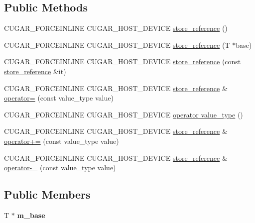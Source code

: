 \subsection*{Public Methods}
\begin{DoxyCompactItemize}
\item 
C\+U\+G\+A\+R\+\_\+\+F\+O\+R\+C\+E\+I\+N\+L\+I\+NE C\+U\+G\+A\+R\+\_\+\+H\+O\+S\+T\+\_\+\+D\+E\+V\+I\+CE \hyperlink{structcugar_1_1cuda_1_1store__reference_ab56aeb2a05979c31d804544dd7eed83b}{store\+\_\+reference} ()
\item 
C\+U\+G\+A\+R\+\_\+\+F\+O\+R\+C\+E\+I\+N\+L\+I\+NE C\+U\+G\+A\+R\+\_\+\+H\+O\+S\+T\+\_\+\+D\+E\+V\+I\+CE \hyperlink{structcugar_1_1cuda_1_1store__reference_a918aa3ac7cefdf20105b490e2ba5aa59}{store\+\_\+reference} (T $\ast$base)
\item 
C\+U\+G\+A\+R\+\_\+\+F\+O\+R\+C\+E\+I\+N\+L\+I\+NE C\+U\+G\+A\+R\+\_\+\+H\+O\+S\+T\+\_\+\+D\+E\+V\+I\+CE \hyperlink{structcugar_1_1cuda_1_1store__reference_afb98e23cc7c9a7cf5bda4938dd200c55}{store\+\_\+reference} (const \hyperlink{structcugar_1_1cuda_1_1store__reference}{store\+\_\+reference} \&it)
\item 
C\+U\+G\+A\+R\+\_\+\+F\+O\+R\+C\+E\+I\+N\+L\+I\+NE C\+U\+G\+A\+R\+\_\+\+H\+O\+S\+T\+\_\+\+D\+E\+V\+I\+CE \hyperlink{structcugar_1_1cuda_1_1store__reference}{store\+\_\+reference} \& \hyperlink{structcugar_1_1cuda_1_1store__reference_a0e6edeb8418e39730eed64b7821e8fc8}{operator=} (const value\+\_\+type value)
\item 
C\+U\+G\+A\+R\+\_\+\+F\+O\+R\+C\+E\+I\+N\+L\+I\+NE C\+U\+G\+A\+R\+\_\+\+H\+O\+S\+T\+\_\+\+D\+E\+V\+I\+CE \hyperlink{structcugar_1_1cuda_1_1store__reference_a7cd742e206cf9bbe7f4052e93d6ca45d}{operator value\+\_\+type} ()
\item 
C\+U\+G\+A\+R\+\_\+\+F\+O\+R\+C\+E\+I\+N\+L\+I\+NE C\+U\+G\+A\+R\+\_\+\+H\+O\+S\+T\+\_\+\+D\+E\+V\+I\+CE \hyperlink{structcugar_1_1cuda_1_1store__reference}{store\+\_\+reference} \& \hyperlink{structcugar_1_1cuda_1_1store__reference_aee235f22969fe1e5ac1cefb19395b086}{operator+=} (const value\+\_\+type value)
\item 
C\+U\+G\+A\+R\+\_\+\+F\+O\+R\+C\+E\+I\+N\+L\+I\+NE C\+U\+G\+A\+R\+\_\+\+H\+O\+S\+T\+\_\+\+D\+E\+V\+I\+CE \hyperlink{structcugar_1_1cuda_1_1store__reference}{store\+\_\+reference} \& \hyperlink{structcugar_1_1cuda_1_1store__reference_a76cbf538cd56f8d074db460eda0e2891}{operator-\/=} (const value\+\_\+type value)
\end{DoxyCompactItemize}
\subsection*{Public Members}
\begin{DoxyCompactItemize}
\item 
\mbox{\label{structcugar_1_1cuda_1_1store__reference_afd445c62481ea90d2948546b9ddb3ecc}} 
T $\ast$ {\bfseries m\+\_\+base}
\end{DoxyCompactItemize}


